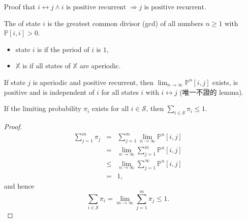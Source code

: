 \begin{exercise}
Proof that $ i \leftrightarrow j \wedge i \text{ is positive recurrent } \Rightarrow j \text{ is positive recurrent}. $
\end{exercise}

\begin{definition}
The  of state $ i $ is the greatest common divisor (gcd) of all numbers $ n \ge 1 $ with $ \mathbb{P}[i, i] > 0 $.

\begin{itemize}
  \item state $ i $ is  if the period of $ i $ is $ 1 $,
  \item $ \mathbb{X} $ is  if all states of $ \mathbb{X} $ are aperiodic.
\end{itemize}
\end{definition}

\begin{lemma} \label{lem:lim-p_nij-exists}
If state $ j $ is aperiodic and positive recurrent, then $ \lim_{n \to \infty} \mathbb{P}^{n}[i, j] $ exists, is positive and is independent of $ i $ for all states $ i $ with $ i \leftrightarrow j $ (唯一不證的 lemma).

\begin{comment}
In general, if $ d $ is the period of $ j $, then
\[ \lim_{t \to \infty} \mathbb{P}^{td}[i, j] = \frac{d}{\mu_{i}} \]
\end{comment}
\end{lemma}

\begin{inequality} \label{ineq:sum-pi-le-1}
If the limiting probability $ \pi_{i} $ exists for all $ i \in \mathcal{S} $, then $ \sum_{i \in \mathcal{S}} \pi_{i} \le 1 $.

\begin{proof}
\begin{eqnarray*}
\sum_{j = 1}^{m} \pi_{j}
  & = & \sum_{j = 1}^{m} \lim_{n \to \infty} \mathbb{P}^{n}[i, j] \\
  & = & \lim_{n \to \infty} \sum_{j = 1}^{m} \mathbb{P}^{n}[i, j] \\
  & \le & \lim_{n \to \infty} \sum_{j = 1}^{\infty} \mathbb{P}^{n}[i, j] \\
  & = & 1,
\end{eqnarray*}
and hence
\[ \sum_{i \in \mathcal{S}} \pi_{i} = \lim_{m \to \infty} \sum_{j = 1}^{m} \pi_{j} \le 1. \]
\end{proof}
\end{inequality}

